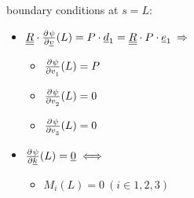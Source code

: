 \begin{frame}
\begin{multicols}{2}
    \vspace{1em}
    boundary conditions at $s=L$:
      \begin{itemize}
        \item $\doubleunderline{R} \cdot \pd{\psi}{\underline{v}}(L) = P \cdot \underline{d}_1 = \doubleunderline{R} \cdot P \cdot \underline{e}_1 \: \Rightarrow$
          \begin{itemize}
            \item $\pd{\psi}{v_1}(L) = P$
            \item $\pd{\psi}{v_2}(L) = 0$
            \item $\pd{\psi}{v_3}(L) = 0$
          \end{itemize}
        \item $\pd{\psi}{\underline{k}}(L) = \underline{0} \iff$
          \begin{itemize}
            \item $M_i(L) = 0 \: (i \in {1,2,3})$
          \end{itemize}
      \end{itemize}
  \end{multicols}
\end{frame}


